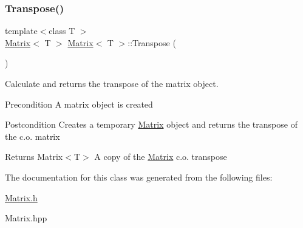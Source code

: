 \subsubsection{\texorpdfstring{Transpose()}{Transpose()}}
{\footnotesize\ttfamily template$<$class T $>$ \\
\mbox{\hyperlink{class_matrix}{Matrix}}$<$ T $>$ \mbox{\hyperlink{class_matrix}{Matrix}}$<$ T $>$\+::Transpose (\begin{DoxyParamCaption}{ }\end{DoxyParamCaption})}



Calculate and returns the transpose of the matrix object. 

\begin{DoxyPrecond}{Precondition}
A matrix object is created 
\end{DoxyPrecond}
\begin{DoxyPostcond}{Postcondition}
Creates a temporary \mbox{\hyperlink{class_matrix}{Matrix}} object and returns the transpose of the c.\+o. matrix 
\end{DoxyPostcond}
\begin{DoxyReturn}{Returns}
Matrix$<$\+T$>$ A copy of the \mbox{\hyperlink{class_matrix}{Matrix}} c.\+o. transpose 
\end{DoxyReturn}


The documentation for this class was generated from the following files\+:\begin{DoxyCompactItemize}
\item 
\mbox{\hyperlink{_matrix_8h}{Matrix.\+h}}\item 
Matrix.\+hpp\end{DoxyCompactItemize}
